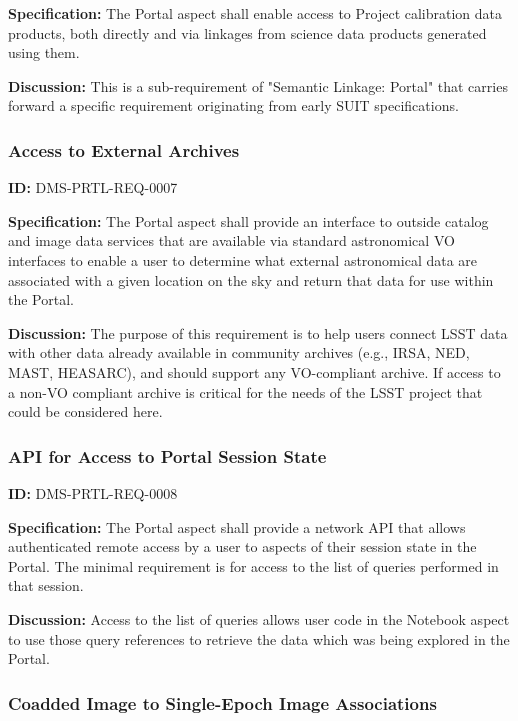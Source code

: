\documentclass[SE,toc,lsstdraft]{lsstdoc}
\begin{document}
\textbf{Specification:}
The Portal aspect shall enable access to Project calibration data products, both directly and via linkages from science data products generated using them.

\textbf{Discussion:}
This is a sub-requirement of "Semantic Linkage: Portal" that carries forward a specific requirement originating from early SUIT specifications.

\subsubsection{Access to External Archives}

\label{DMS-PRTL-REQ-0007}
\textbf{ID:} DMS-PRTL-REQ-0007

\textbf{Specification:}
The Portal aspect shall provide an interface to outside catalog and image data services that are available via standard astronomical VO interfaces to enable a user to determine what external astronomical data are associated with a given location on the sky and return that data for use within the Portal.

\textbf{Discussion:}
The purpose of this requirement is to help users connect LSST data with other data already available in community archives (e.g., IRSA, NED, MAST, HEASARC), and should support any VO-compliant archive.  If access to a non-VO compliant archive is critical for the needs of the LSST project that could be considered here.

\subsubsection{API for Access to Portal Session State}

\label{DMS-PRTL-REQ-0008}
\textbf{ID:} DMS-PRTL-REQ-0008

\textbf{Specification:}
The Portal aspect shall provide a network API that allows authenticated remote access by a user to aspects of their session state in the Portal.  The minimal requirement is for access to the list of queries performed in that session.

\textbf{Discussion:}
Access to the list of queries allows user code in the Notebook aspect to use those query references to retrieve the data which was being explored in the Portal.

\subsubsection{Coadded Image to Single-Epoch Image Associations}
\end{document}
